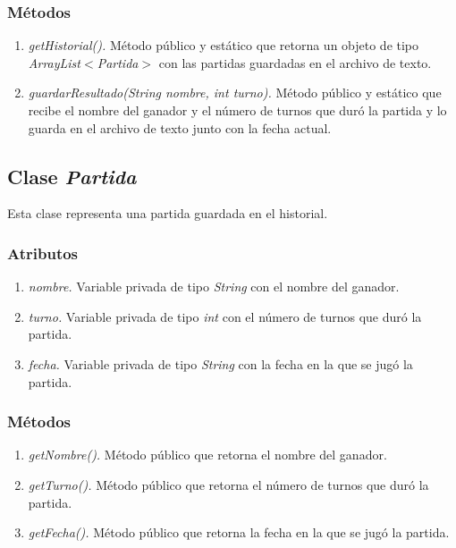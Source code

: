 \documentclass[12pt]{article}
\begin{document}
  \subsubsection{Métodos}
  \begin{enumerate}
    \item \textit{getHistorial().} Método público y estático que retorna un objeto de tipo \textit{ArrayList$<$Partida$>$} con las partidas guardadas en el archivo de texto.
    \item \textit{guardarResultado(String nombre, int turno).} Método público y estático que recibe el nombre del ganador y el número de turnos que duró la partida y lo guarda en el archivo de texto junto con la fecha actual.
  \end{enumerate}

  \subsection{Clase \textit{Partida}}
  Esta clase representa una partida guardada en el historial.

  \subsubsection{Atributos}
  \begin{enumerate}
    \item \textit{nombre.} Variable privada de tipo \textit{String} con el nombre del ganador.
    \item \textit{turno.} Variable privada de tipo \textit{int} con el número de turnos que duró la partida.
    \item \textit{fecha.} Variable privada de tipo \textit{String} con la fecha en la que se jugó la partida.
  \end{enumerate}

  \subsubsection{Métodos}
  \begin{enumerate}
    \item \textit{getNombre().} Método público que retorna el nombre del ganador.
    \item \textit{getTurno().} Método público que retorna el número de turnos que duró la partida.
    \item \textit{getFecha().} Método público que retorna la fecha en la que se jugó la partida.
  \end{enumerate}
\end{document}

